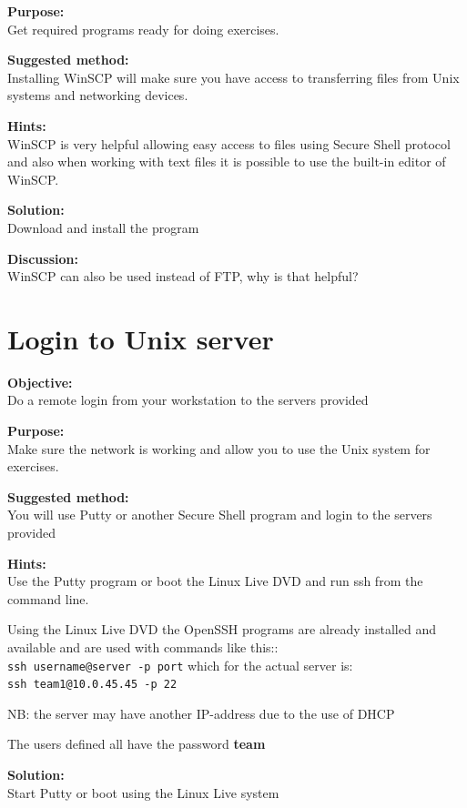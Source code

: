 \documentclass[a4paper,11pt,notitlepage]{report}
\begin{document}
{\bf Purpose:}\\
Get required programs ready for doing exercises.

{\bf Suggested method:}\\
Installing WinSCP will make sure you have access to transferring files from Unix systems and networking devices.


{\bf Hints:}\\
WinSCP is very helpful allowing easy access to files using Secure Shell protocol
and also when working with text files it is possible to use the built-in editor
of WinSCP.

{\bf Solution:}\\
Download and install the program

{\bf Discussion:}\\
WinSCP can also be used instead of FTP, why is that helpful?

\chapter{Login to Unix server}
\label{ex:unix-login}


{\bf Objective:}\\
Do a remote login from your workstation to the servers provided

{\bf Purpose:}\\
Make sure the network is working and allow you to use the Unix system for exercises.

{\bf Suggested method:}\\
You will use Putty or another Secure Shell program and login to the servers provided

{\bf Hints:}\\
Use the Putty program or boot the Linux Live DVD and run ssh from the command line.

Using the Linux Live DVD the OpenSSH programs are already installed and available
and are used with commands like this::\\
\verb+ssh username@server -p port+ which for the actual server is:\\
\verb+ssh team1@10.0.45.45 -p 22+

NB: the server may have another IP-address due to the use of DHCP

The users defined all have the password {\bf team}

{\bf Solution:}\\
Start Putty or boot using the Linux Live system
\end{document}
